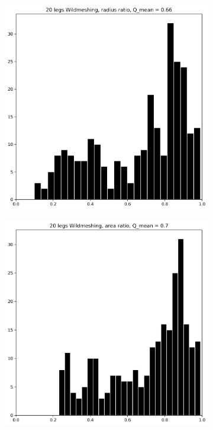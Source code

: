 \documentclass[acmtog]{acmart}
\begin{document}
\begin{figure}[H]
\begin{subfigure}{0.22\textwidth}
  \end{subfigure}
  \begin{subfigure}{0.22\textwidth}
    \includegraphics[width=\textwidth]{Images/histograms/20 legs Wildmeshing, radius ratio .png}
    \centering
  \end{subfigure}\hfill
  \begin{subfigure}{0.22\textwidth}
    \centering
    \includegraphics[width=\textwidth]{Images/histograms/20 legs Wildmeshing, area ratio .png}

\end{subfigure}
\end{figure}
\end{document}
